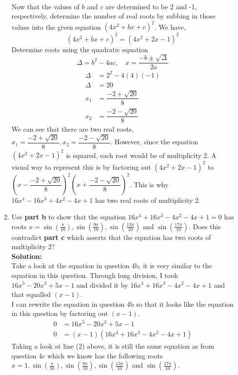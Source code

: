 \documentclass[12pt]{book}
\begin{document}
\begin{enumerate}
\begin{enumerate}
\begin{align}
\end{align}
Now that the values of $b$ and $c$ are determined to be 2 and -1, respectively, determine the number of real roots by subbing in those values into the given equation $(4x^2 + bx + c)^2$. We have,
$$(4x^2 + bx + c)^2 = (4x^2 + 2x - 1)^2$$
Determine roots using the quadratic equation $$\Delta = b^2-4ac, \quad x = \dfrac{-b\pm \sqrt{\Delta}}{2a}$$
\begin{align}
    \Delta &= 2^2 - 4(4)(-1) \\
    \Delta &= 20 \\
    x_1 &= \dfrac{-2 + \sqrt{20}}{8} \\
    x_2 &= \dfrac{-2 - \sqrt{20}}{8}
\end{align}
We can see that there are two real roots, $x_1 = \dfrac{-2 + \sqrt{20}}{8},    x_2 = \dfrac{-2 - \sqrt{20}}{8}$. However, since the equation $(4x^2 + 2x - 1)^2$ is squared, each root would be of multiplicity 2. A visual way to represent this is by factoring out $(4x^2 + 2x - 1)^2$ to $\left(x-\dfrac{-2 + \sqrt{20}}{8}\right)^2\left(x+\dfrac{-2 - \sqrt{20}}{8}\right)^2$. This is why $16x^4 - 16x^3 + 4x^2 - 4x+ 1$ has two real roots of multiplicity 2. \\


\item Use \textbf{part b} to show that the equation $16x^4 + 16x^3 - 4x^2 -4x + 1 = 0$ has roots $x=\sin(\frac{\pi}{10}), \sin(\frac{9\pi}{10}), \sin(\frac{13\pi}{10})$ and $\sin(\frac{17\pi}{10})$. Does this contradict \textbf{part c} which asserts that the equation has two roots of multiplicity 2?\\

\textbf{Solution:}\\
Take a look at the equation in question 4b, it is very similar to the equation in this question. Through long division, I took $16x^5 - 20x^3 + 5x - 1$ and divided it by $16x^4 + 16x^3 - 4x^2 - 4x + 1$ and that equalled $(x-1)$.\\

I can rewrite the equation in question 4b so that it looks like the equation in this question by factoring out $(x-1)$.
\setcounter{equation}{0}
\begin{align}
    0 &= 16x^5 - 20x^3 + 5x - 1 \\
    0 &= (x-1)(16x^4 + 16x^3 - 4x^2 - 4x + 1)
\end{align}
Taking a look at line (2) above, it is still the same equation as from question 4c which we know has the following roots $x=1, \sin(\frac{\pi}{10}), \sin(\frac{9\pi}{10}), \sin(\frac{13\pi}{10})$  and $\sin(\frac{17\pi}{10})$. \\


\end{enumerate}
\end{enumerate}
\end{document}
